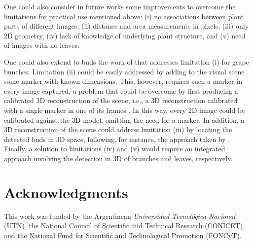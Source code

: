\documentclass[a4paper,authoryear,review]{elsarticle}
\begin{document}
One could also consider in future works some improvements to overcome the limitations for practical use mentioned above: (i) no associations between plant parts of different images, (ii) distance and area measurements in pixels, (iii) only 2D geometry, (iv) lack of knowledge of underlying plant structure, and (v) need of images with no leaves. 

One could also extend to buds the work of \citet{santos2020grape} that addresses limitation (i) for grape bunches. Limitation (ii) could be easily addressed by adding to the visual scene some marker with known dimensions. This, however, requires such a marker in every image captured, a problem that could be overcome by first producing a calibrated 3D reconstruction of the scene, i.e., a 3D reconstruction calibrated with a single marker in one of its frames \citep{hartley2003multiple, moons20093d}. In this way, every 2D image could be calibrated against the 3D model, omitting the need for a marker. In addition, a 3D reconstruction of the scene could address limitation (iii) by locating the detected buds in 3D space, following, for instance, the approach taken by \citet{diaz2018grapevine}. Finally, a solution to limitations (iv) and (v) would require an integrated approach involving the detection in 3D of branches and leaves, respectively. 

\section*{Acknowledgments}

This work was funded by the Argentinean \emph{Universidad Tecnológica Nacional} (UTN), the National Council of Scientific and Technical Research (CONICET), and the National Fund for Scientific and Technological Promotion (FONCyT).


\end{document}
